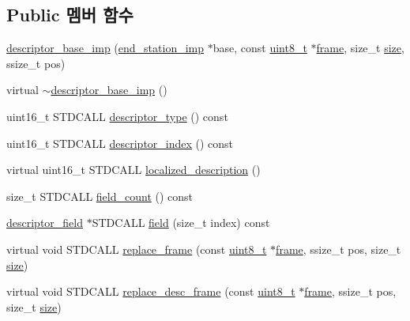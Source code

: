 \subsection*{Public 멤버 함수}
\begin{DoxyCompactItemize}
\item 
\hyperlink{classavdecc__lib_1_1descriptor__base__imp_afce4f89b7126c42e77054b5c76e21fc6}{descriptor\+\_\+base\+\_\+imp} (\hyperlink{classavdecc__lib_1_1end__station__imp}{end\+\_\+station\+\_\+imp} $\ast$base, const \hyperlink{stdint_8h_aba7bc1797add20fe3efdf37ced1182c5}{uint8\+\_\+t} $\ast$\hyperlink{gst__avb__playbin_8c_ac8e710e0b5e994c0545d75d69868c6f0}{frame}, size\+\_\+t \hyperlink{gst__avb__playbin_8c_a439227feff9d7f55384e8780cfc2eb82}{size}, ssize\+\_\+t pos)
\item 
virtual \hyperlink{classavdecc__lib_1_1descriptor__base__imp_a0d9ec54b8a33590464a983bc559926db}{$\sim$descriptor\+\_\+base\+\_\+imp} ()
\item 
uint16\+\_\+t S\+T\+D\+C\+A\+LL \hyperlink{classavdecc__lib_1_1descriptor__base__imp_aefc543029ab093823c3f5b9d84f0ccc4}{descriptor\+\_\+type} () const 
\item 
uint16\+\_\+t S\+T\+D\+C\+A\+LL \hyperlink{classavdecc__lib_1_1descriptor__base__imp_ac23c0a35276c07cfce8c8660700c2135}{descriptor\+\_\+index} () const 
\item 
virtual uint16\+\_\+t S\+T\+D\+C\+A\+LL \hyperlink{classavdecc__lib_1_1descriptor__base__imp_aa94307532fbb37e2f986fee8fec79373}{localized\+\_\+description} ()
\item 
size\+\_\+t S\+T\+D\+C\+A\+LL \hyperlink{classavdecc__lib_1_1descriptor__base__imp_a9b98d4f427a6c527e9080c938cfa9334}{field\+\_\+count} () const 
\item 
\hyperlink{classavdecc__lib_1_1descriptor__field}{descriptor\+\_\+field} $\ast$S\+T\+D\+C\+A\+LL \hyperlink{classavdecc__lib_1_1descriptor__base__imp_a5f8127d32e2aa54777ca03bf09e8d7b5}{field} (size\+\_\+t index) const 
\item 
virtual void S\+T\+D\+C\+A\+LL \hyperlink{classavdecc__lib_1_1descriptor__base__imp_a482fe95208e9e14885e28e73e7be2c49}{replace\+\_\+frame} (const \hyperlink{stdint_8h_aba7bc1797add20fe3efdf37ced1182c5}{uint8\+\_\+t} $\ast$\hyperlink{gst__avb__playbin_8c_ac8e710e0b5e994c0545d75d69868c6f0}{frame}, ssize\+\_\+t pos, size\+\_\+t \hyperlink{gst__avb__playbin_8c_a439227feff9d7f55384e8780cfc2eb82}{size})
\item 
virtual void S\+T\+D\+C\+A\+LL \hyperlink{classavdecc__lib_1_1descriptor__base__imp_a8dbf7d4faedf36ec789d33f228e22039}{replace\+\_\+desc\+\_\+frame} (const \hyperlink{stdint_8h_aba7bc1797add20fe3efdf37ced1182c5}{uint8\+\_\+t} $\ast$\hyperlink{gst__avb__playbin_8c_ac8e710e0b5e994c0545d75d69868c6f0}{frame}, ssize\+\_\+t pos, size\+\_\+t \hyperlink{gst__avb__playbin_8c_a439227feff9d7f55384e8780cfc2eb82}{size})

\end{DoxyCompactItemize}
